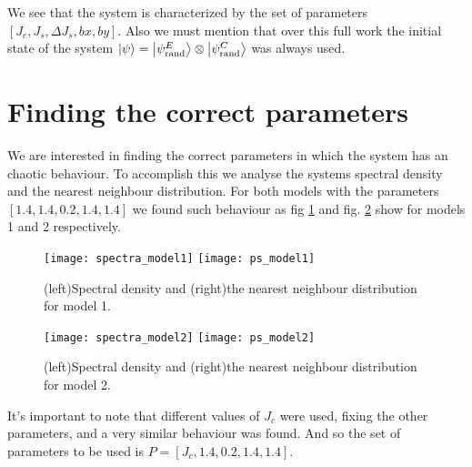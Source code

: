 \documentclass[twocolumn,floatfix]{article}
\begin{document}
We see that the system is characterized by the set of parameters
$[J_c,J_s,\Delta J_s,bx,by]$.  Also we must mention that over this full work
the initial state of the system $\Ket{\psi} = \Ket{\psi_{\rm rand}^{E}}  \otimes \Ket{\psi_{\rm rand}^{C}} $ was
always used.

\section{Finding the correct parameters}
We are interested in finding the correct parameters in which the system has an chaotic behaviour.
To accomplish this we analyse the systems spectral density and the nearest neighbour distribution.
For both models with the parameters $[1.4,1.4,0.2,1.4,1.4]$ we found such behaviour as fig \ref{ps_model1}
and fig. \ref{ps_model2} show for models 1 and 2 respectively. 
\begin{figure}[H]
\begin{center}
\texttt{[image: spectra\_model1]} \hfill
\texttt{[image: ps\_model1]} 
\end{center}
\caption{(left)Spectral density and (right)the nearest neighbour distribution for model 1.}
\label{ps_model1}
\end{figure}
\begin{figure}[H]
\begin{center}
\texttt{[image: spectra\_model2]} \hfill
\texttt{[image: ps\_model2]} 
\end{center}
\caption{(left)Spectral density and (right)the nearest neighbour distribution for model 2.}
\label{ps_model2}
\end{figure}

It's important to note that different values of
$J_c$ were used, fixing the other parameters, and a very similar behaviour was found.
And so the set of parameters to be used is $P=[J_c,1.4,0.2,1.4,1.4]$.
\end{document}
